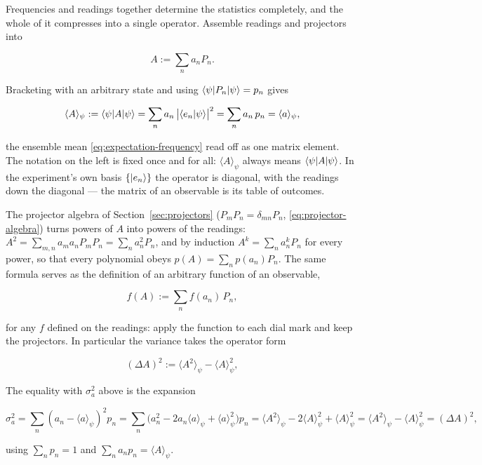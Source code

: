 Frequencies and readings together determine the statistics completely, and the whole of it compresses into a single operator. Assemble readings and projectors into
\begin{linenomath}
\begin{equation}
    A:=\sum_n a_n P_n .
    \label{eq:spectral-decomposition}
\end{equation}
\end{linenomath}
Bracketing with an arbitrary state and using $\braket{\psi|P_n|\psi}=p_n$ gives
\begin{linenomath}
\begin{equation}
    \langle A\rangle_\psi:=\braket{\psi|A|\psi}
    =\sum_n a_n\,\bigl|\braket{e_n|\psi}\bigr|^2
    =\sum_n a_n\,p_n
    =\langle a\rangle_\psi ,
    \label{eq:expectation-operator}
\end{equation}
\end{linenomath}
the ensemble mean \eqref{eq:expectation-frequency} read off as one matrix element. The notation on the left is fixed once and for all: $\langle A\rangle_\psi$ always means $\braket{\psi|A|\psi}$. In the experiment's own basis $\{\ket{e_n}\}$ the operator is diagonal, with the readings down the diagonal --- the matrix of an observable is its table of outcomes.

The projector algebra of Section~\ref{sec:projectors} ($P_mP_n=\delta_{mn}P_n$, \eqref{eq:projector-algebra}) turns powers of $A$ into powers of the readings: $A^2=\sum_{m,n}a_ma_nP_mP_n=\sum_n a_n^2P_n$, and by induction $A^k=\sum_n a_n^kP_n$ for every power, so that every polynomial obeys $p(A)=\sum_n p(a_n)P_n$. The same formula serves as the definition of an arbitrary function of an observable,
\begin{linenomath}
\begin{equation}
    f(A):=\sum_n f(a_n)\,P_n ,
    \label{eq:function-of-observable}
\end{equation}
\end{linenomath}
for any $f$ defined on the readings: apply the function to each dial mark and keep the projectors. In particular the variance takes the operator form
\begin{linenomath}
\begin{equation}
    (\Delta A)^2:=\langle A^2\rangle_\psi-\langle A\rangle_\psi^2 ,
    \label{eq:variance}
\end{equation}
\end{linenomath}
The equality with $\sigma_a^2$ above is the expansion
\begin{linenomath}
\begin{equation}
    \sigma_a^2 = \sum_n (a_n-\langle a\rangle_\psi)^2 p_n
    = \sum_n\bigl(a_n^2-2a_n\langle a\rangle_\psi+\langle a\rangle_\psi^2\bigr)p_n
    = \langle A^2\rangle_\psi - 2\langle A\rangle_\psi^2 + \langle A\rangle_\psi^2
    = \langle A^2\rangle_\psi - \langle A\rangle_\psi^2 = (\Delta A)^2 ,
\end{equation}
\end{linenomath}
using $\sum_n p_n=1$ and $\sum_n a_n p_n=\langle A\rangle_\psi$.

